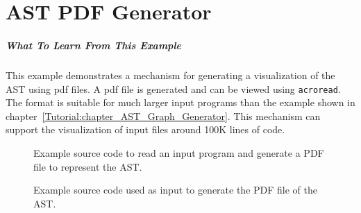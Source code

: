 \chapter{AST PDF Generator}
\label{Tutorial:chapter_AST_PDF_Generator}

\paragraph{What To Learn From This Example}
This example demonstrates a mechanism for generating a visualization
of the AST using pdf files.  A pdf file is generated and can be viewed 
using {\tt acroread}.  The format is suitable for much larger input 
programs than the example shown in chapter~\ref{Tutorial:chapter_AST_Graph_Generator}.
This mechanism can support the visualization of input files around 100K 
lines of code.

\begin{figure}[!h]
{\indent
{\mySmallFontSize


\begin{latexonly}
   
\end{latexonly}

\begin{htmlonly}
   
\end{htmlonly}

}
}
\caption{Example source code to read an input program and generate a PDF file to represent the AST.}
\label{Tutorial:exampleAST_PDF_Generator}
\end{figure}

\begin{figure}[!h]
{\indent
{\mySmallFontSize


\begin{latexonly}
   
\end{latexonly}

\begin{htmlonly}
   
\end{htmlonly}

}
}
\caption{Example source code used as input to generate the PDF file of the AST.}
\label{Tutorial:exampleInputCode_AST_PDF_Generator}
\end{figure}

